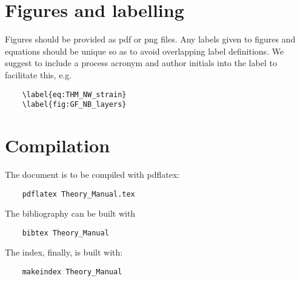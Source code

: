 \section{Figures and labelling}
Figures should be provided as pdf or png files. Any labels given to figures and equations should be unique so as to avoid overlapping label definitions. We suggest to include a process acronym and author initials into the label to facilitate this, e.g.
\begin{verbatim}
	\label{eq:THM_NW_strain}
	\label{fig:GF_NB_layers}
\end{verbatim}

\section{Compilation}
The document is to be compiled with pdflatex:
\begin{verbatim}
	pdflatex Theory_Manual.tex
\end{verbatim}
The bibliography can be built with 
\begin{verbatim}
	bibtex Theory_Manual
\end{verbatim}
The index, finally, is built with:
\begin{verbatim}
	makeindex Theory_Manual
\end{verbatim}